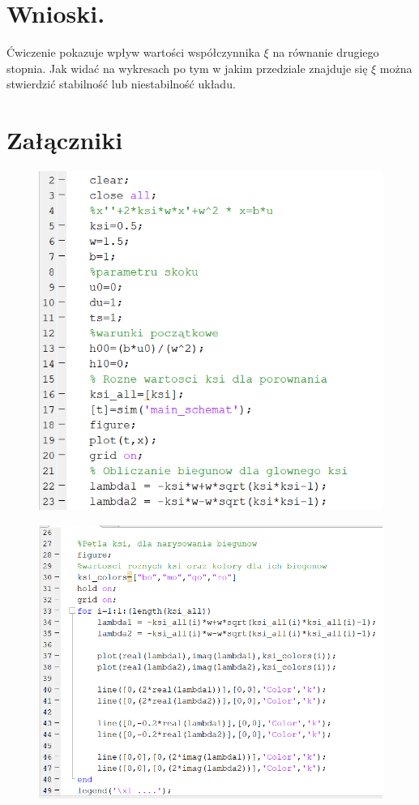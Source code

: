 \documentclass{article}
\begin{document}
\section{Wnioski.}


\par Ćwiczenie pokazuje wpływ wartości współczynnika $\xi$ na równanie drugiego stopnia. Jak widać na wykresach po tym w jakim przedziale znajduje się $\xi$ można stwierdzić stabilność lub niestabilność układu.
\newpage
\section{Załączniki}

 \begin{figure}[h!]
    \centering
    \includegraphics[scale=0.6]{Kod1P.png}
 \end{figure}
 
 \begin{figure}[h!]
    \centering
    \includegraphics[scale=0.6]{Kod2P.png}
 \end{figure}
\end{document}
